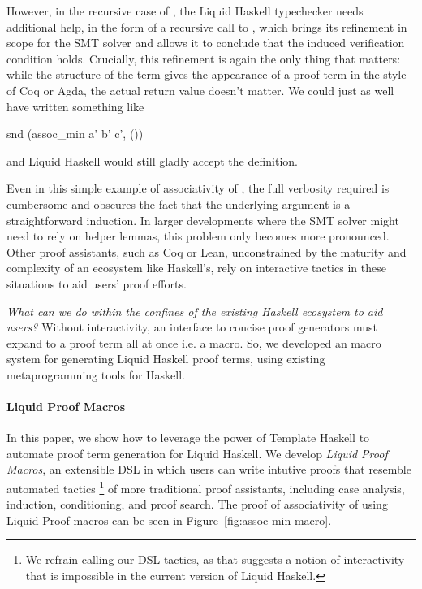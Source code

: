 However, in the recursive case of , the Liquid Haskell typechecker needs
additional help, in the form of a recursive call to , which
brings its refinement in scope for the SMT solver and allows it to conclude that
the induced verification condition holds. Crucially, this refinement is again the
only thing that matters: while the structure of the term gives the appearance
of a proof term in the style of Coq or Agda, the actual return value doesn't matter.
We could just as well have written something like
\begin{code}
  snd (assoc_min a' b' c', ())
\end{code}
and Liquid Haskell would still gladly accept the definition.

Even in this simple example of associativity of , the full
verbosity required is cumbersome and obscures the fact that the
underlying argument is a straightforward induction. In larger
developments where the SMT solver might need to rely on helper lemmas,
this problem only becomes more pronounced.  Other proof assistants,
such as Coq or Lean, unconstrained by the maturity and complexity of
an ecosystem like Haskell's, rely on interactive tactics in these
situations to aid users' proof efforts.

\smallskip

{\em What can we do within the confines of the existing Haskell
  ecosystem to aid users?}
  Without interactivity, an interface to concise proof generators must expand to
  a proof term all at once i.e. a macro. So, we developed an macro
  system for generating Liquid Haskell proof terms, using existing
  metaprogramming tools for Haskell.

\paragraph*{Liquid Proof Macros}

In this paper, we show how to leverage the power of Template Haskell
to automate proof term generation for Liquid Haskell.  We develop {\em
  Liquid Proof Macros}, an extensible DSL in which users can write
intutive proofs that resemble automated tactics%
\footnote{We refrain calling our DSL tactics, as that suggests a
  notion of interactivity that is impossible in the current version
  of Liquid Haskell.}%
%
of more traditional proof assistants, including case analysis,
induction, conditioning, and proof search. The proof of associativity
of  using Liquid Proof macros can be seen in
Figure~\ref{fig:assoc-min-macro}.


